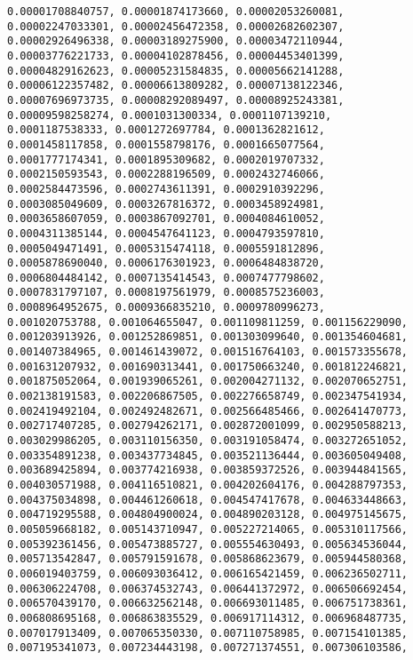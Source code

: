 \documentclass[12pt]{article}
\begin{document}
\begin{verbatim}
0.00001708840757, 0.00001874173660, 0.00002053260081, 
0.00002247033301, 0.00002456472358, 0.00002682602307, 
0.00002926496338, 0.00003189275900, 0.00003472110944, 
0.00003776221733, 0.00004102878456, 0.00004453401399, 
0.00004829162623, 0.00005231584835, 0.00005662141288, 
0.00006122357482, 0.00006613809282, 0.00007138122346, 
0.00007696973735, 0.00008292089497, 0.00008925243381, 
0.00009598258274, 0.0001031300334, 0.0001107139210, 
0.0001187538333, 0.0001272697784, 0.0001362821612, 
0.0001458117858, 0.0001558798176, 0.0001665077564, 
0.0001777174341, 0.0001895309682, 0.0002019707332, 
0.0002150593543, 0.0002288196509, 0.0002432746066, 
0.0002584473596, 0.0002743611391, 0.0002910392296, 
0.0003085049609, 0.0003267816372, 0.0003458924981, 
0.0003658607059, 0.0003867092701, 0.0004084610052, 
0.0004311385144, 0.0004547641123, 0.0004793597810, 
0.0005049471491, 0.0005315474118, 0.0005591812896, 
0.0005878690040, 0.0006176301923, 0.0006484838720, 
0.0006804484142, 0.0007135414543, 0.0007477798602, 
0.0007831797107, 0.0008197561979, 0.0008575236003, 
0.0008964952675, 0.0009366835210, 0.0009780996273, 
0.001020753788, 0.001064655047, 0.001109811259, 0.001156229090, 
0.001203913926, 0.001252869851, 0.001303099640, 0.001354604681, 
0.001407384965, 0.001461439072, 0.001516764103, 0.001573355678, 
0.001631207932, 0.001690313441, 0.001750663240, 0.001812246821, 
0.001875052064, 0.001939065261, 0.002004271132, 0.002070652751, 
0.002138191583, 0.002206867505, 0.002276658749, 0.002347541934, 
0.002419492104, 0.002492482671, 0.002566485466, 0.002641470773, 
0.002717407285, 0.002794262171, 0.002872001099, 0.002950588213, 
0.003029986205, 0.003110156350, 0.003191058474, 0.003272651052, 
0.003354891238, 0.003437734845, 0.003521136444, 0.003605049408, 
0.003689425894, 0.003774216938, 0.003859372526, 0.003944841565, 
0.004030571988, 0.004116510821, 0.004202604176, 0.004288797353, 
0.004375034898, 0.004461260618, 0.004547417678, 0.004633448663, 
0.004719295588, 0.004804900024, 0.004890203128, 0.004975145675, 
0.005059668182, 0.005143710947, 0.005227214065, 0.005310117566,
0.005392361456, 0.005473885727, 0.005554630493, 0.005634536044, 
0.005713542847, 0.005791591678, 0.005868623679, 0.005944580368, 
0.006019403759, 0.006093036412, 0.006165421459, 0.006236502711, 
0.006306224708, 0.006374532743, 0.006441372972, 0.006506692454, 
0.006570439170, 0.006632562148, 0.006693011485, 0.006751738361, 
0.006808695168, 0.006863835529, 0.006917114312, 0.006968487735, 
0.007017913409, 0.007065350330, 0.007110758985, 0.007154101385, 
0.007195341073, 0.007234443198, 0.007271374551, 0.007306103586, 

\end{verbatim}
\end{document}
